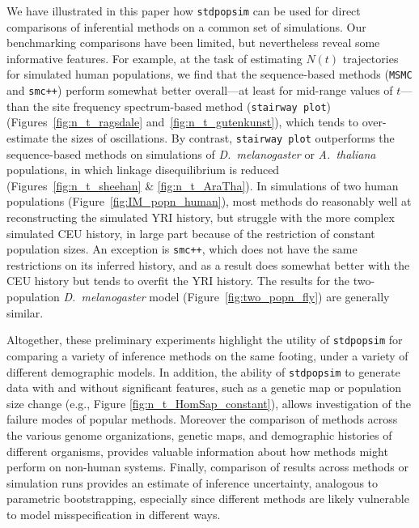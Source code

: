 \documentclass[12pt,halfline,a4paper]{ouparticle}
\newcommand{\stdpopsim}{\texttt{stdpopsim}\xspace}
\newcommand{\MSMC}{\texttt{MSMC}\xspace}
\newcommand{\smcpp}{\texttt{smc++}\xspace}
\newcommand{\stairwayplot}{\texttt{stairway plot}\xspace}
\begin{document}

We have illustrated in this paper how \stdpopsim can be used for direct
comparisons of inferential methods on a common set of simulations. Our
benchmarking comparisons have been limited, but nevertheless
reveal some informative features. For
example, at the task of estimating $N(t)$ trajectories for simulated human
populations, we find that the sequence-based methods (\MSMC and \smcpp)
perform somewhat better overall---at least for mid-range values of
$t$---than the site frequency spectrum-based method (\stairwayplot)
(Figures~\ref{fig:n_t_ragsdale} and~\ref{fig:n_t_gutenkunst}), which
tends to over-estimate the sizes of oscillations.  By contrast,
\stairwayplot outperforms the sequence-based methods
on simulations of \textit{D.~melanogaster} or \textit{A.~thaliana} populations,
in which linkage disequilibrium is reduced (Figures~\ref{fig:n_t_sheehan} \& \ref{fig:n_t_AraTha}).
In simulations of two human populations
(Figure~\ref{fig:IM_popn_human}), most methods do reasonably well at
reconstructing the simulated YRI history, but struggle with the more complex simulated CEU
history, in large part because of the restriction of constant population sizes.
An exception is \smcpp, which does not have the same
restrictions on its inferred history, and as a result does somewhat better
with the CEU history but tends to overfit the YRI history.  The results for
the two-population \textit{D.~melanogaster} model (Figure~\ref{fig:two_popn_fly})
are generally similar.

Altogether, these preliminary experiments highlight
the utility of \stdpopsim for comparing a variety of inference methods on
the same footing, under a variety of different demographic models.
In addition, the ability of \stdpopsim to generate data with and without significant features, such
as a genetic map or population size change (e.g., Figure \ref{fig:n_t_HomSap_constant}), allows
investigation of the failure modes of popular methods.
Moreover the comparison of methods across the various genome organizations, genetic maps,
and demographic histories of different organisms, provides valuable information
about how methods might perform on non-human systems.
Finally, comparison of results across methods or simulation runs
provides an estimate of inference uncertainty, analogous to parametric
bootstrapping,
especially since different methods are likely vulnerable to model misspecification
in different ways.
\end{document}
